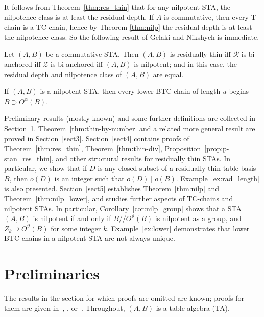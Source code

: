 \documentclass[ALCO,ThmDefs,Unicode,epreuves]{cedram}
\begin{document}
 
It follows from Theorem~\ref{thm:res_thin} that for any nilpotent STA,
the nilpotence class is at least the residual depth. If $A$ is
commutative, then every T-chain is a TC-chain, hence by Theorem
\ref{thm:nilp} the residual depth
is at least the nilpotence class. So the following result of Gelaki and
Nikshych is immediate.

\begin{coro}
\label{cor:class_v_depth} 
\cite [Theorem~4.16]{GN} Let $(A, B)$ be a commutative STA. Then $(A,
B)$ is residually thin iff $\mathcal{R}$ is bi-anchored iff
$\mathcal{Z}$ is bi-anchored iff $(A, B)$ is nilpotent; and in this
case, the residual depth and nilpotence class of $(A, B)$ are equal.
\end{coro}

\begin{thm}
\label{thm:nilp_lower}
If $(A, B)$ is a nilpotent STA, then every lower BTC-chain of length $u$
begins $B \supset O^{\alpha}(B)$.
\end{thm}



Preliminary results (mostly known) and some further definitions are
collected in Section~\ref{sect2}. Theorem~\ref{thm:thin-by-number} and a related
more general result are proved in Section~\ref{sect3}. Section~\ref{sect4} contains proofs of Theorem~\ref{thm:res_thin}, Theorem~\ref{thm:thin-div},
Proposition~\ref{prop:p-stan_res_thin}, and other
structural results for residually thin STAs. 
 In particular, we
show that if $D$ is any closed subset of a residually thin table basis
$B$, then $o(D)$ is an integer such that $o(D) \mid o(B)$. Example~\ref{ex:rad_length} is also presented.
Section~\ref{sect5} establishes Theorem~\ref{thm:nilp} and Theorem~\ref{thm:nilp_lower}, and studies further aspects of TC-chains and nilpotent STAs. In particular, Corollary~\ref{cor:nilp_group} 
shows that a STA $(A, B)$ is nilpotent if and only if
$B//O^{\vartheta}(B)$ is nilpotent as a group, and $Z_k \supseteq
O^{\vartheta}(B)$ for some integer $k$. Example~\ref{ex:lower}
demonstrates 
that lower BTC-chains in a nilpotent STA are not always
unique. 



\section{Preliminaries}\label{sect2}
The results in the section for which proofs are omitted are known;
proofs for them are given 
in~\cite{AFM}, \cite{BZ}, or~\cite{Blau2}. Throughout,
$(A, B)$ is a table algebra (TA).
\end{document}
